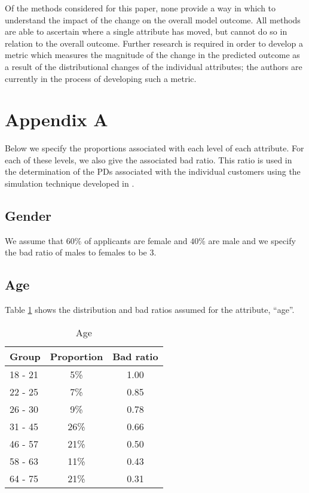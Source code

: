 \documentclass{article}
\theoremstyle{def}
\begin{document}
Of the methods considered for this paper, none provide a way in which to understand the impact of the change on the overall model outcome. All methods are able to ascertain where a single attribute has moved, but cannot do so in relation to the overall outcome. Further research is required in order to develop a metric which measures the magnitude of the change in the predicted outcome as a result of the distributional changes of the individual attributes; the authors are currently in the process of developing such a metric.

\setcounter{section}{5}
\section{Appendix A}

Below we specify the proportions associated with each level of each attribute. For each of these levels, we also give the associated bad ratio. This ratio is used in the determination of the PDs associated with the individual customers using the simulation technique developed in \cite{DUPISANIEVISAGIEALLISON2022}.

\subsection{Gender}

We assume that $60\%$ of applicants are female and $40\%$ are male and we specify the bad ratio of males to females to be $3$.

\subsection{Age}

Table \ref{Age_param} shows the distribution and bad ratios assumed for the attribute, ``age''.
\begin{table}[H]%
\caption{Age}
\label{Age_param}
\centering
\small
\begin{tabular}{lcc}
\hline
Group & Proportion & Bad ratio \\
\hline
18 - 21 & 5\% & 1.00\\
22 - 25 & 7\% & 0.85\\
26 - 30 & 9\% & 0.78\\
31 - 45 & 26\% & 0.66\\
46 - 57 & 21\% & 0.50\\
58 - 63 & 11\% & 0.43\\
64 - 75 & 21\% & 0.31\\
\hline
\end{tabular}
\end{table}
\end{document}
